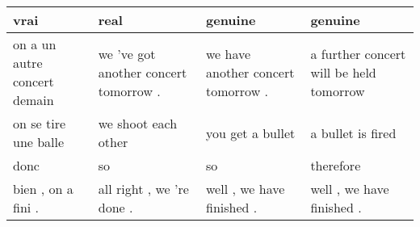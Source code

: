 \documentclass[11pt,a4paper]{article}
\begin{document}
\begin{table*}[]
\begin{tabular}{|p{3.5cm}|p{3.5cm}|p{3.5cm}|p{3.5cm}|}
vrai                                                                                                                                              & real                                                                                                                         & genuine                                                                                                                                             & genuine                                                                                                                                           \\ \hline
on a un autre concert demain                                                                                                                      & we 've got another concert tomorrow .                                                                                        & we have another concert tomorrow .                                                                                                                  & a further concert will be held tomorrow                                                                                                           \\ \hline
on se tire une balle                                                                                                                              & we shoot each other                                                                                                          & you get a bullet                                                                                                                                    & a bullet is fired                                                                                                                                 \\ \hline
donc                                                                                                                           & so                                                                                                     & so                                                                                                                        & therefore                                                                                                                \\ \hline
bien , on a fini .                                                                                                                                & all right , we 're done .                                                                                                    & well , we have finished .                                                                                                                           & well , we have finished .                                                                                                                         \\ \hline

\end{tabular}
\end{table*}
\end{document}
